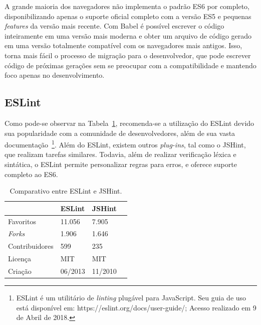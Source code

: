 A grande maioria dos navegadores não implementa o padrão ES6 por completo, disponibilizando apenas o suporte oficial completo com a versão ES5 e pequenas \textit{features} da versão mais recente. Com Babel é possível escrever o código inteiramente em uma versão mais moderna e obter um arquivo de código gerado em uma versão totalmente compatível com os navegadores mais antigos. Isso, torna mais fácil o processo de migração para o desenvolvedor, que pode escrever código de próximas gerações sem se preocupar com a compatibilidade e mantendo foco apenas no desenvolvimento.
%
%
%
\subsection{ESLint}
\label{SubESLint}

Como pode-se observar na Tabela~\ref{tab:eslintvsjshint}, recomenda-se a utilização do ESLint devido sua popularidade com a comunidade de desenvolvedores, além de sua vasta documentação~\footnote{ESLint é um utilitário de \textit{linting} plugável para JavaScript. Seu guia de uso está disponível em: https://eslint.org/docs/user-guide/; Acesso realizado em 9 de Abril de 2018.}. Além do ESLint, existem outros \textit{plug-ins}, tal como o JSHint, que realizam tarefas similares. Todavia, além de realizar verificação léxica e sintática, o ESLint permite personalizar regras para erros, e oferece suporte completo ao ES6.

\begin{table}[th]
\centering
\caption{Comparativo entre ESLint e JSHint.}
\label{tab:eslintvsjshint}
\begin{tabular}{llll}
                &   ESLint  &   JSHint\\\hline

Favoritos       &   11.056  &   7.905\\
\textit{Forks}  &   1.906   &   1.646\\
Contribuidores  &   599     &   235\\
Licença         &   MIT     &   MIT\\
Criação         &   06/2013 &   11/2010\\
\hline
\end{tabular}
\begin{flushleft}
\end{flushleft}
\end{table}

